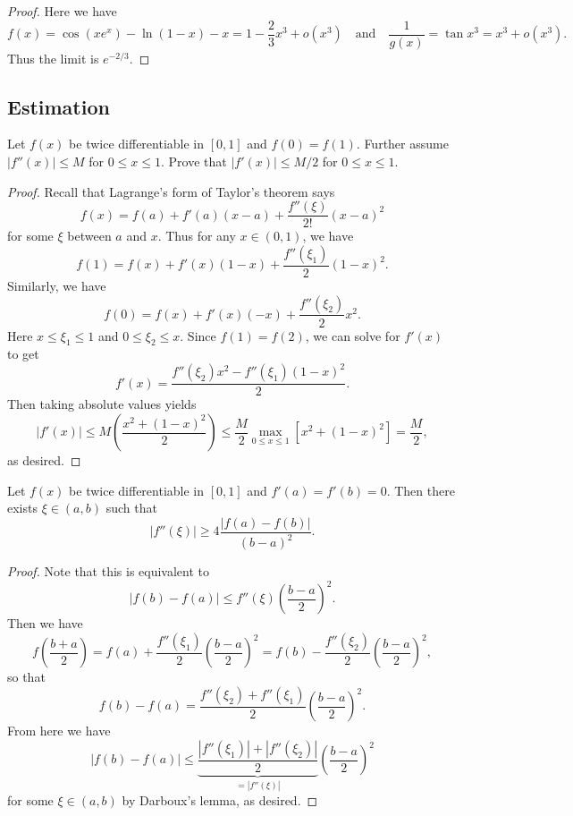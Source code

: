 \begin{proof}
  Here we have
  \[
    f(x) = \cos(xe^x) - \ln(1 - x) - x
    = 1 - \frac{2}{3} x^3 + o(x^3) \quad
    \text{and} \quad \frac{1}{g(x)} = \tan x^3 = x^3 + o(x^3).
  \]
  Thus the limit is $e^{-2 / 3}$.
\end{proof}

\subsection{Estimation}
\begin{example}
  Let $f(x)$ be twice differentiable in $[0, 1]$ and
  $f(0) = f(1)$. Further assume $|f''(x)| \le M$
  for $0 \le x \le 1$. Prove that
  $|f'(x)| \le M / 2$ for $0 \le x \le 1$.
\end{example}

\begin{proof}
  Recall that Lagrange's form of Taylor's theorem says
  \[
    f(x) = f(a) + f'(a) (x - a) + \frac{f''(\xi)}{2!}(x - a)^2
  \]
  for some $\xi$ between $a$ and $x$. Thus for any
  $x \in (0, 1)$, we have
  \[
    f(1) = f(x) + f'(x)(1 - x) + \frac{f''(\xi_1)}{2}(1 - x)^2.
  \]
  Similarly, we have
  \[
    f(0) = f(x) + f'(x)(-x) + \frac{f''(\xi_2)}{2}x^2.
  \]
  Here $x \le \xi_1 \le 1$ and $0 \le \xi_2 \le x$.
  Since $f(1) = f(2)$, we can solve for $f'(x)$ to get
  \[
    f'(x) = \frac{f''(\xi_2)x^2 - f''(\xi_1)(1 - x)^2}{2}.
  \]
  Then taking absolute values yields
  \[
    |f'(x)| \le M \left(\frac{x^2 + (1 - x)^2}{2}\right) \le \frac{M}{2} \max_{0 \le x \le 1} \left[x^2 + (1 - x)^2\right]
    = \frac{M}{2},
  \]
  as desired.
\end{proof}

\begin{example}
  Let $f(x)$ be twice differentiable in $[0, 1]$ and
  $f'(a) = f'(b) = 0$. Then there exists $\xi \in (a, b)$
  such that
  \[
    |f''(\xi)| \ge 4 \frac{|f(a) - f(b)|}{(b - a)^2}.
  \]
\end{example}

\begin{proof}
  Note that this is equivalent to
  \[
    |f(b) - f(a)| \le f''(\xi)\left(\frac{b - a}{2}\right)^2.
  \]
  Then we have
  \[
    f\left(\frac{b + a}{2}\right) = f(a) + \frac{f''(\xi_1)}{2}\left(\frac{b - a}{2}\right)^2
    = f(b) - \frac{f''(\xi_2)}{2}\left(\frac{b - a}{2}\right)^2,
  \]
  so that
  \[
    f(b) - f(a) = \frac{f''(\xi_2) + f''(\xi_1)}{2} \left(\frac{b - a}{2}\right)^2.
  \]
  From here we have
  \[
    |f(b) - f(a)| \le \underbrace{\frac{|f''(\xi_1)| + |f''(\xi_2)|}{2}}_{= |f''(\xi)|} \left(\frac{b - a}{2}\right)^2
  \]
  for some $\xi \in (a, b)$ by Darboux's lemma, as
  desired.
\end{proof}
